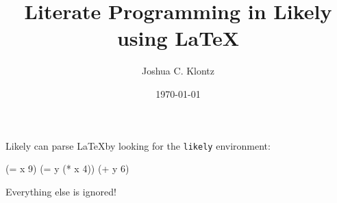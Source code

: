 \documentclass{article}
\title{Literate Programming in Likely using \LaTeX}
\author{Joshua C. Klontz}
\date{\today}
\newenvironment{likely}
{ \verbatim }
{ \endverbatim }
\begin{document}
\maketitle

Likely can parse \LaTeX by looking for the \texttt{likely} environment:

\begin{likely}
(= x 9)
(= y (* x 4))
(+ y 6)
\end{likely}

Everything else is ignored!
\end{document}
